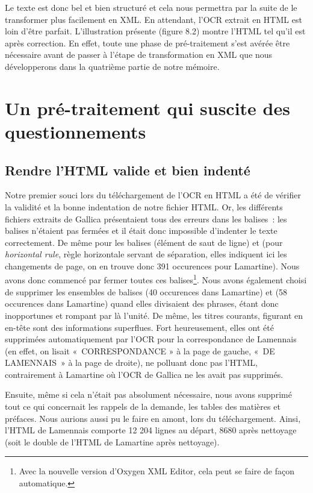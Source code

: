 Le texte est donc bel et bien structuré et cela nous permettra par la suite de le transformer plus facilement en XML. En attendant, l'OCR extrait en HTML est loin d'être parfait. L'illustration présente (figure 8.2) montre l'HTML tel qu'il est après correction. En effet, toute une phase de pré-traitement s'est avérée être nécessaire avant de passer à l'étape de transformation en XML que nous développerons dans la quatrième partie de notre mémoire.


\section{Un pré-traitement qui suscite des questionnements}

\subsection{Rendre l'HTML valide et bien indenté}

Notre premier souci lors du téléchargement de l'OCR en HTML a été de vérifier la validité et la bonne indentation de notre fichier HTML. Or, les différents fichiers extraits de Gallica présentaient tous des erreurs dans les balises~: les balises  n'étaient pas fermées et il était donc impossible d'indenter le texte correctement. De même pour les balises  (élément de saut de ligne) et  (pour \emph{horizontal rule}, règle horizontale servant de séparation, elles indiquent ici les changements de page, on en trouve donc 391 occurences pour Lamartine). Nous avons donc commencé par fermer toutes ces balises\footnote{Avec la nouvelle version d'Oxygen XML Editor, cela peut se faire de façon automatique.}. Nous avons également choisi de supprimer les ensembles de balises  (40 occurences dans Lamartine) et  (58 occurences dans Lamartine) quand elles divisaient des phrases, étant donc inopportunes et rompant par là l'unité. De même, les titres courants, figurant en en-tête sont des informations superflues. Fort heureusement, elles ont été supprimées automatiquement par l'OCR pour la correspondance de Lamennais (en effet, on lisait « CORRESPONDANCE » à la page de gauche, « DE LAMENNAIS » à la page de droite), ne polluant donc pas l’HTML, contrairement à Lamartine où l'OCR de Gallica ne les avait pas supprimés.

Ensuite, même si cela n'était pas absolument nécessaire, nous avons supprimé tout ce qui concernait les rappels de la demande, les tables des matières et préfaces. Nous aurions aussi pu le faire en amont, lors du téléchargement.
Ainsi, l’HTML de Lamennais comporte 12 204 lignes au départ, 8680 après nettoyage (soit le double de l’HTML de Lamartine après nettoyage). 

